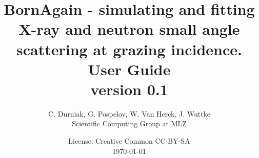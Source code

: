 \documentclass[a4paper,10pt]{report}
\title{
BornAgain - simulating and fitting X-ray and neutron small angle  scattering at grazing incidence. \\
\vspace*{10mm} User Guide \\
\large{ version 0.1}
\vspace*{5mm}
}
\author{ 
{\large C. Durniak, G. Pospelov, W. Van Herck, J. Wuttke }\\
Scientific Computing Group at MLZ \\
\vspace*{50mm}
}
\date{
License: Creative Common CC-BY-SA \\
\today
}
\begin{document}
\maketitle
\tableofcontents
\lstlistoflistings
\listoftables

%
%
%
%

%


%



\end{document}
